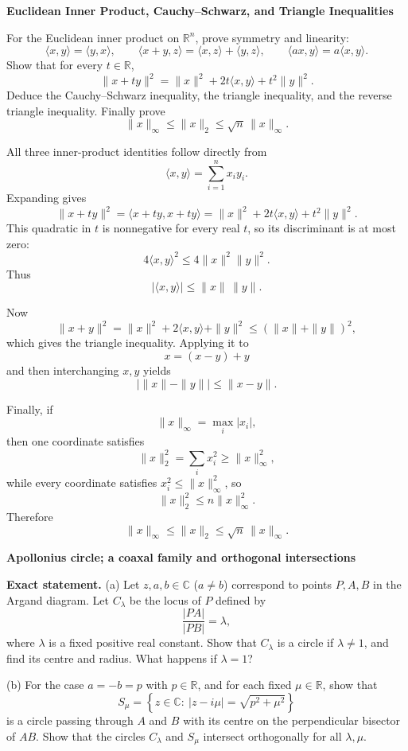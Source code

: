 \begin{problem}[CP-I-0021]
\label{prob:cp-i-0021}
\textbf{Euclidean Inner Product, Cauchy--Schwarz, and Triangle Inequalities}

\hspace*{1.5em}For the Euclidean inner product on \(\mathbb R^n\), prove symmetry and linearity:
\[
\langle x,y\rangle=\langle y,x\rangle,
\qquad
\langle x+y,z\rangle=\langle x,z\rangle+\langle y,z\rangle,
\qquad
\langle ax,y\rangle=a\langle x,y\rangle.
\]
Show that for every \(t\in\mathbb R\),
\[
\|x+ty\|^2
=
\|x\|^2+2t\langle x,y\rangle+t^2\|y\|^2.
\]
Deduce the Cauchy--Schwarz inequality, the triangle inequality, and the reverse triangle
inequality. Finally prove
\[
\|x\|_\infty\le\|x\|_2\le\sqrt n\,\|x\|_\infty.
\]
\end{problem}

\begin{solution}
All three inner-product identities follow directly from
\[
\langle x,y\rangle
=
\sum_{i=1}^n x_i y_i.
\]
Expanding gives
\[
\|x+ty\|^2
=
\langle x+ty,x+ty\rangle
=
\|x\|^2+2t\langle x,y\rangle+t^2\|y\|^2.
\]
This quadratic in \(t\) is nonnegative for every real \(t\), so its discriminant is at most zero:
\[
4\langle x,y\rangle^2
\le
4\|x\|^2\|y\|^2.
\]
Thus
\[
|\langle x,y\rangle|
\le
\|x\|\,\|y\|.
\]

Now
\[
\|x+y\|^2
=
\|x\|^2+2\langle x,y\rangle+\|y\|^2
\le
(\|x\|+\|y\|)^2,
\]
which gives the triangle inequality. Applying it to
\[
x=(x-y)+y
\]
and then interchanging \(x,y\) yields
\[
|\|x\|-\|y\||
\le
\|x-y\|.
\]

Finally, if
\[
\|x\|_\infty=\max_i|x_i|,
\]
then one coordinate satisfies
\[
\|x\|_2^2
=
\sum_i x_i^2
\ge
\|x\|_\infty^2,
\]
while every coordinate satisfies \(x_i^2\le\|x\|_\infty^2\), so
\[
\|x\|_2^2
\le
n\|x\|_\infty^2.
\]
Therefore
\[
\|x\|_\infty
\le
\|x\|_2
\le
\sqrt n\,\|x\|_\infty.
\]
\end{solution}

\begin{problem}[CP-I-0031]
\label{prob:cp-i-0031}
\textbf{Apollonius circle; a coaxal family and orthogonal intersections}

\textbf{Exact statement.}
\hspace*{1.5em}(a) Let \(z,a,b\in\mathbb C\) (\(a\neq b\)) correspond to points \(P,A,B\) in the Argand diagram.
Let \(C_\lambda\) be the locus of \(P\) defined by
\[
\frac{|PA|}{|PB|}=\lambda,
\]
where \(\lambda\) is a fixed positive real constant. Show that \(C_\lambda\) is a circle if \(\lambda\neq 1\),
and find its centre and radius. What happens if \(\lambda=1\)?

(b) For the case \(a=-b=p\) with \(p\in\mathbb R\), and for each fixed \(\mu\in\mathbb R\), show that
\[
S_\mu=\left\{z\in\mathbb C:\ |z-i\mu|=\sqrt{p^2+\mu^2}\right\}
\]
is a circle passing through \(A\) and \(B\) with its centre on the perpendicular bisector of \(AB\).
Show that the circles \(C_\lambda\) and \(S_\mu\) intersect orthogonally for all \(\lambda,\mu\).

\end{problem}


